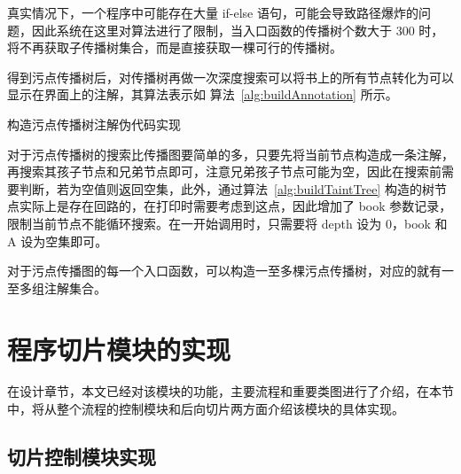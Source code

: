 真实情况下，一个程序中可能存在大量 if-else 语句，可能会导致路径爆炸的问题，因此系统在这里对算法进行了限制，当入口函数的传播树个数大于 300 时，将不再获取子传播树集合，而是直接获取一棵可行的传播树。

得到污点传播树后，对传播树再做一次深度搜索可以将书上的所有节点转化为可以显示在界面上的注解，其算法表示如 算法~\ref{alg:buildAnnotation} 所示。

\begin{algorithm}[!htb]\footnotesize
    \caption{构造污点传播树注解伪代码实现}
    \label{alg:buildAnnotation}
\end{algorithm}

对于污点传播树的搜索比传播图要简单的多，只要先将当前节点构造成一条注解，再搜索其孩子节点和兄弟节点即可，注意兄弟孩子节点可能为空，因此在搜索前需要判断，若为空值则返回空集，此外，通过算法~\ref{alg:buildTaintTree} 构造的树节点实际上是存在回路的，在打印时需要考虑到这点，因此增加了 book 参数记录，限制当前节点不能循环搜索。在一开始调用时，只需要将 depth 设为 0，book 和 A 设为空集即可。

对于污点传播图的每一个入口函数，可以构造一至多棵污点传播树，对应的就有一至多组注解集合。

\section{程序切片模块的实现}
在设计章节，本文已经对该模块的功能，主要流程和重要类图进行了介绍，在本节中，将从整个流程的控制模块和后向切片两方面介绍该模块的具体实现。\\

\subsection{切片控制模块实现}

